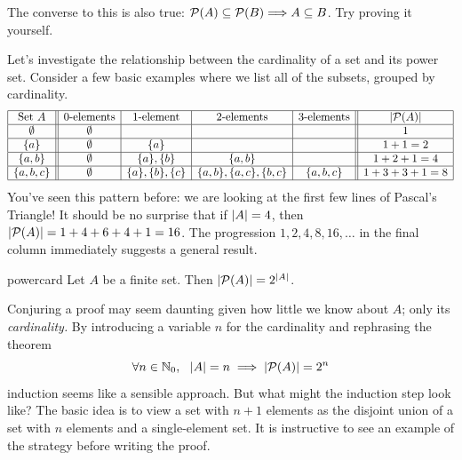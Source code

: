 The converse to this is also true: $\mathcal{P}(A)\subseteq\mathcal{P}(B)\Longrightarrow A\subseteq B$. Try proving it yourself.




Let's investigate the relationship between the cardinality of a set and its power set. Consider a few basic examples where we list all of the subsets, grouped by cardinality.
\[
	\begin{array}{|c||c|c|c|c||c|}
		\hline
		\text{Set }A&\text{0-elements}&\text{1-element}&\text{2-elements}&\text{3-elements}&\left| \mathcal{P}(A)\right|\\\hline
		\emptyset&\emptyset&&&&1\\\hline
		\{a\}&\emptyset&\{a\}&&&1+1=2\\\hline
		\{a,b\}&\emptyset&\{a\},\{b\}&\{a,b\}&&1+2+1=4\\\hline
		\{a,b,c\}&\emptyset&\{a\},\{b\},\{c\}&\{a,b\},\{a,c\},\{b,c\}&\{a,b,c\}&1+3+3+1=8\\\hline
	\end{array}
\]
You've seen this pattern before: we are looking at the first few lines of Pascal's Triangle!%
It should be no surprise that if $\left| A\right|=4$, then $\left| \mathcal{P}(A)\right|=1+4+6+4+1=16$. The progression $1,2,4,8,16,\ldots$ in the final column immediately suggests a general result.

\begin{thm}{}{powercard}
	Let $A$ be a finite set. Then $\left| \mathcal{P}(A)\right|=2^{\left| A\right|}$.
\end{thm}

Conjuring a proof may seem daunting given how little we know about $A$; only its \emph{cardinality.} By introducing a variable $n$ for the cardinality and rephrasing the theorem
\[
	\forall n\in\mathbb{N}_0,\ \ \left| A\right|=n\implies \left| \mathcal{P}(A)\right|=2^{n}
\]
induction seems like a sensible approach. But what might the induction step look like? The basic idea is to view a set with $n+1$ elements as the disjoint union of a set with $n$ elements and a single-element set. It is instructive to see an example of the strategy before writing the proof. 

